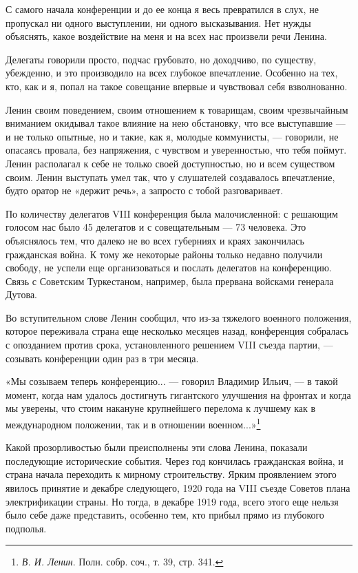 \documentclass[12pt, a4paper, openany]{book}
\begin{document}
С самого начала конференции и до ее конца я весь превратился в слух, не пропускал ни одного выступлении, ни одного высказывания. Нет нужды объяснять, какое воздействие на меня и на всех нас произвели речи Ленина.

Делегаты говорили просто, подчас грубовато, но доходчиво, по существу, убежденно, и это производило на всех глубокое впечатление. Особенно на тех, кто, как и я, попал на такое совещание впервые и чувствовал себя взволнованно.

Ленин своим поведением, своим отношением к товарищам, своим чрезвычайным вниманием окидывал такое влияние на нею обстановку, что все выступавшие — и не только опытные, но и такие, как я, молодые коммунисты, — говорили, не опасаясь провала, без напряжения, с чувством и уверенностью, что тебя поймут. Ленин располагал к себе не только своей доступностью, но и всем существом своим. Ленин выступать умел так, что у слушателей создавалось впечатление, будто оратор не «держит речь», а запросто с тобой разговаривает.

По количеству делегатов VIII конференция была малочисленной: с решающим голосом нас было 45 делегатов и с совещательным — 73 человека. Это объяснялось тем, что далеко не во всех губерниях и краях закончилась гражданская война. К тому же некоторые районы только недавно получили свободу, не успели еще организоваться и послать делегатов на конференцию. Связь с Советским Туркестаном, например, была прервана войсками генерала Дутова.

Во вступительном слове Ленин сообщил, что из-за тяжелого военного положения, которое переживала страна еще несколько месяцев назад, конференция собралась с опозданием против срока, установленного решением VIII съезда партии, — созывать конференции один раз в три месяца.

«Мы созываем теперь конференцию... — говорил Владимир Ильич, — в такой момент, когда нам удалось достигнуть гигантского улучшения на фронтах и когда мы уверены, что стоим накануне крупнейшего перелома к лучшему как в международном положении, так и в отношении военном...»\footnote{\textit{В. И. Ленин}. Полн. собр. соч., т. 39, стр. 341.}

Какой прозорливостью были преисполнены эти слова Ленина, показали последующие исторические события. Через год кончилась гражданская война, и страна начала переходить к мирному строительству. Ярким проявлением этого явилось принятие и декабре следующего, 1920 года на VIII съезде Советов плана электрификации страны. Но тогда, в декабре 1919 года, всего этого еще нельзя было себе даже представить, особенно тем, кто прибыл прямо из глубокого подполья.
\end{document}
